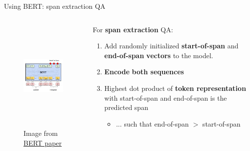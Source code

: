 \documentclass[12pt,aspectratio=169,handout]{beamer}
\begin{document}
\begin{frame}{Using BERT: span extraction QA}
	\begin{columns}[T] %
		\begin{column}{.48\textwidth}
	\begin{figure}[h]
		\includegraphics[height=5.5cm]{bert-spanex-qa}
		\caption*{Image from \href{https://arxiv.org/pdf/1810.04805.pdf}{\underline{BERT paper}}}
	\end{figure}
\end{column}

\begin{column}{.48\textwidth}
	For \textbf{span extraction} QA:
	\begin{enumerate}
		\item Add randomly initialized \textbf{start-of-span} and \textbf{end-of-span} \textbf{vectors} to the model.
		\pause
		\item \textbf{Encode} \textbf{both sequences}
		\pause
		\item Highest dot product of \textbf{token representation} with start-of-span and end-of-span is the predicted span
		\pause
		\begin{itemize}
			\item ... such that end-of-span $>$ start-of-span
		\end{itemize}
	\end{enumerate}
\end{column}
\end{columns}

\end{frame}
\end{document}
